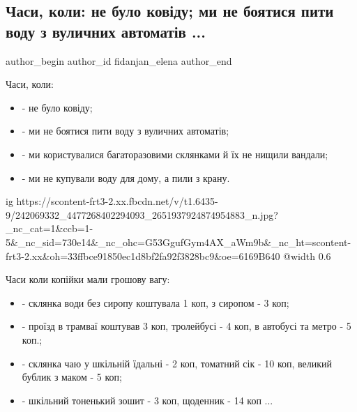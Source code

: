  
 
 
 
 
 
\subsection{Часи, коли: не було ковіду; ми не боятися пити воду з вуличних автоматів ...}
\label{sec:15_09_2021.fb.fidanjan_elena.1.vremja_kogda}
 
\ifcmt
 author_begin
   author_id fidanjan_elena
 author_end
\fi

Часи, коли:

\begin{itemize}
  \item - не було ковіду;
  \item - ми не боятися пити воду з вуличних автоматів;
  \item - ми користувалися багаторазовими склянками й їх не нищили вандали;
  \item - ми не купували воду для дому, а пили з крану.
\end{itemize}

\ifcmt
  ig https://scontent-frt3-2.xx.fbcdn.net/v/t1.6435-9/242069332_4477268402294093_2651937924874954883_n.jpg?_nc_cat=1&ccb=1-5&_nc_sid=730e14&_nc_ohc=G53GgufGym4AX_aWm9b&_nc_ht=scontent-frt3-2.xx&oh=33ffbce91850ec1d8bf2fa92f3828bc9&oe=6169B640
  @width 0.6
\fi

Часи коли копійки мали грошову вагу:

\begin{itemize}
  \item - склянка води без сиропу коштувала 1 коп, з сиропом - 3 коп;
  \item - проїзд в трамваї коштував 3 коп, тролейбусі - 4 коп, в автобусі та метро - 5 коп.;
  \item - склянка чаю у шкільній їдальні - 2 коп, томатний сік - 10 коп, великий бублик з маком - 5 коп;
  \item - шкільний тоненький зошит - 3 коп, щоденник - 14 коп ...
\end{itemize}


